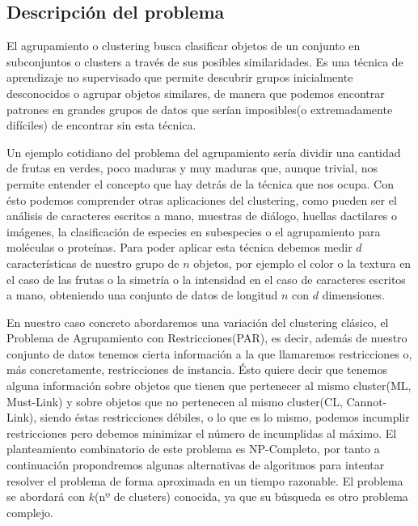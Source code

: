 \documentclass{article}
\begin{document}
	\subsection{Descripción del problema}
	\indent El agrupamiento o clustering busca clasificar objetos de un conjunto en subconjuntos o clusters a
	través de sus posibles similaridades. Es una técnica de aprendizaje no supervisado que permite
	descubrir grupos inicialmente desconocidos o agrupar objetos similares, de manera que podemos
	encontrar patrones en grandes grupos de datos que serían imposibles(o extremadamente difíciles) de
	encontrar sin esta técnica.
	\par
	Un ejemplo cotidiano del problema del agrupamiento sería dividir una cantidad de frutas en verdes,
	poco maduras y muy maduras que, aunque trivial, nos permite entender el concepto que hay detrás
	de la técnica que nos ocupa. Con ésto podemos comprender otras aplicaciones del clustering, como
	pueden ser el análisis de caracteres escritos a mano, muestras de diálogo, huellas dactilares o
	imágenes, la clasificación de especies en subespecies o el agrupamiento para moléculas o proteínas.
	Para poder aplicar esta técnica debemos medir $d$ características de nuestro grupo de $n$ objetos, por
	ejemplo el color o la textura en el caso de las frutas o la simetría o la intensidad en el caso de
	caracteres escritos a mano, obteniendo una conjunto de datos de longitud $n$ con $d$ dimensiones.
	\par
	En nuestro caso concreto abordaremos una variación del clustering clásico, el Problema de
	Agrupamiento con Restricciones(PAR), es decir, además de nuestro conjunto de datos tenemos
	cierta información a la que llamaremos restricciones o, más concretamente, restricciones de
	instancia. Ésto quiere decir que tenemos alguna información sobre objetos que tienen que
	pertenecer al mismo cluster(ML, Must-Link) y sobre objetos que no pertenecen al mismo
	cluster(CL, Cannot-Link), siendo éstas restricciones débiles, o lo que es lo mismo, podemos
	incumplir restricciones pero debemos minimizar el número de incumplidas al máximo.
	El planteamiento combinatorio de este problema es NP-Completo, por tanto a continuación
	propondremos algunas alternativas de algoritmos para intentar resolver el problema de forma
	aproximada en un tiempo razonable. El problema se abordará con $k$(nº de clusters) conocida, ya que
	su búsqueda es otro problema complejo.
	
\end{document}
